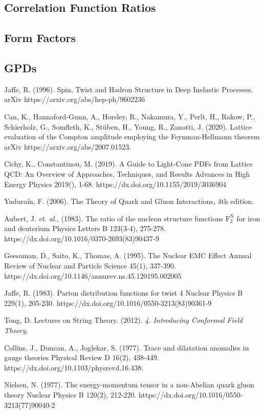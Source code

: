 \documentclass[11pt, oneside]{article}   	%
\theoremstyle{definition}
\begin{document}
\subsection{Correlation Function Ratios}

\subsection{Form Factors}

\subsection{GPDs}

\newpage
\begin{thebibliography}{99}

Jaffe, R. (1996). Spin, Twist and Hadron Structure in Deep Inelastic Processes. arXiv https://arxiv.org/abs/hep-ph/9602236

Can, K., Hannaford-Gunn, A., Horsley, R., Nakamura, Y., Perlt, H., Rakow, P., Schierholz, G., Somfleth, K., St\"uben, H., Young, R., Zanotti, J. (2020). Lattice evaluation of the Compton amplitude employing the Feynman-Hellmann theorem arXiv https://arxiv.org/abs/2007.01523.

Cichy, K., Constantinou, M. (2019). A Guide to Light-Cone PDFs from Lattice QCD: An Overview of Approaches, Techniques, and Results Advances in High Energy Physics  2019(), 1-68. https://dx.doi.org/10.1155/2019/3036904

Yndura\'in, F. (2006). The Theory of Quark and Gluon Interactions, 4th edition.

Aubert, J. \textit{et. al.}, (1983). The ratio of the nucleon structure functions $\mathrm{F_2^N}$ for iron and deuterium Physics Letters B 123(3-4), 275-278. https://dx.doi.org/10.1016/0370-2693(83)90437-9

Geesaman, D., Saito, K., Thomas, A. (1995). The Nuclear EMC Effect Annual Review of Nuclear and Particle Science  45(1), 337-390. https://dx.doi.org/10.1146/annurev.ns.45.120195.002005

Jaffe, R. (1983). Parton distribution functions for twist 4 Nuclear Physics B  229(1), 205-230. https://dx.doi.org/10.1016/0550-3213(83)90361-9

Tong, D. Lectures on String Theory. (2012). \textit{4. Introducing Conformal Field Theory}.

Collins, J., Duncan, A., Joglekar, S. (1977). Trace and dilatation anomalies in gauge theories Physical Review D  16(2), 438-449. https://dx.doi.org/10.1103/physrevd.16.438.

Nielsen, N. (1977). The energy-momentum tensor in a non-Abelian quark gluon theory Nuclear Physics B  120(2), 212-220. https://dx.doi.org/10.1016/0550-3213(77)90040-2

\end{thebibliography}
\end{document}
